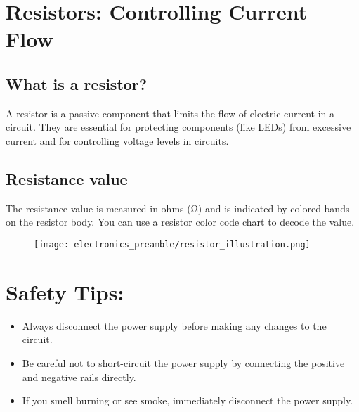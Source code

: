 \section{Resistors: Controlling Current Flow}
\subsection{What is a resistor?}
A resistor is a passive component that limits the flow of electric current in a circuit. They are
essential for protecting components (like LEDs) from excessive current and for controlling voltage
levels in circuits.

\subsection{Resistance value}
The resistance value is measured in ohms (\si{\ohm}) and is indicated by colored bands on the resistor body.
You can use a resistor color code chart to decode the value.

\begin{figure}[H]
\centering
    \texttt{[image: electronics\_preamble/resistor\_illustration.png]}
\end{figure}

\section{Safety Tips:}
\begin{itemize}
    \item Always disconnect the power supply before making any changes to the circuit.
    \item Be careful not to short-circuit the power supply by connecting the positive and negative rails directly.
    \item If you smell burning or see smoke, immediately disconnect the power supply.
\end{itemize}
